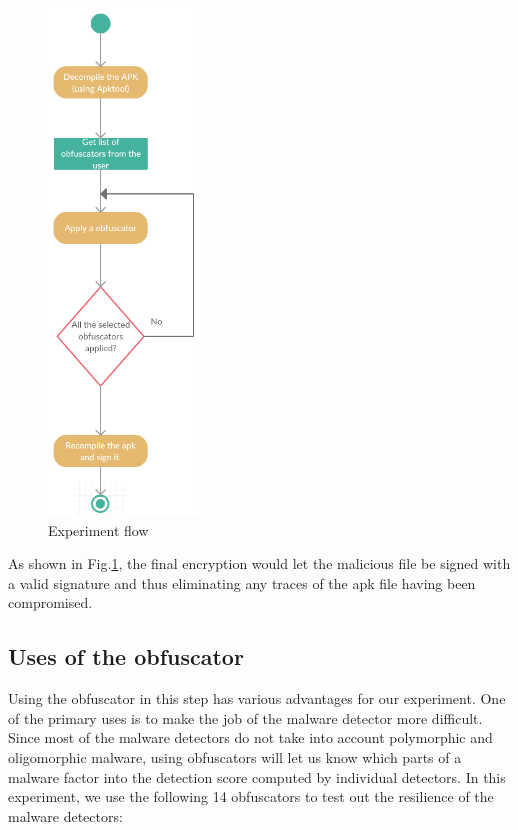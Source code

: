  \begin{figure}[procedure]
 	\centering
 	\includegraphics[width=40mm]{procedure.png}
 	\caption{Experiment flow}
 	\label{procedure}
 \end{figure}
 
 As shown in Fig.\ref{procedure}, the final encryption would let the malicious file be signed with a valid signature and thus eliminating any traces of the apk file having been compromised.
 
\subsection{Uses of the obfuscator}

Using the obfuscator in this step has various advantages for our experiment. One of the primary uses is to make the job of the malware detector more difficult. Since most of the malware detectors do not take into account polymorphic and oligomorphic malware, using obfuscators will let us know which parts of a malware factor into the detection score computed by individual detectors. In this experiment, we use the following 14 obfuscators to test out the resilience of the malware detectors:

